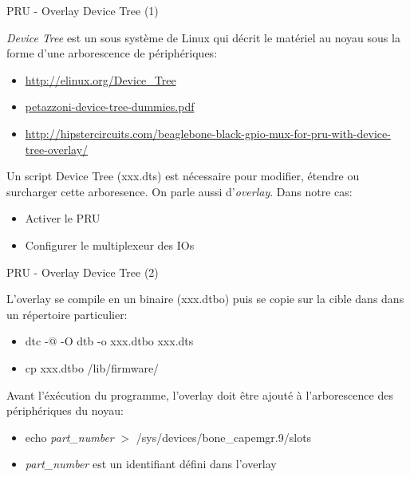 \documentclass{beamer}
\begin{document}
\begin{frame}{PRU - Overlay Device Tree (1)}

  \textit{Device Tree} est un sous syst\`eme de Linux qui
  d\'ecrit le mat\'eriel au noyau sous la forme d'une
  arborescence de p\'eriph\'eriques:
  \begin{itemize}
  \item \begin{tiny} \url{http://elinux.org/Device_Tree} \end{tiny}
  \item \begin{tiny} \url{petazzoni-device-tree-dummies.pdf} \end{tiny}
  \item \begin{tiny} \url{http://hipstercircuits.com/beaglebone-black-gpio-mux-for-pru-with-device-tree-overlay/} \end{tiny} \newline
  \end{itemize}

  Un script Device Tree (xxx.dts) est n\'ecessaire pour modifier,
  \'etendre ou surcharger cette arboresence. On parle aussi
  d'\textit{overlay}. Dans notre cas:
  \begin{itemize}
  \item Activer le PRU
  \item Configurer le multiplexeur des IOs
  \end{itemize}

\end{frame}


\begin{frame}{PRU - Overlay Device Tree (2)}

  L'overlay se compile en un binaire (xxx.dtbo) puis se copie
  sur la cible dans dans un r\'epertoire particulier:
  \begin{itemize}
  \item dtc -@ -O dtb -o xxx.dtbo xxx.dts
  \item cp xxx.dtbo /lib/firmware/ \newline
  \end{itemize}

  Avant l'\'ex\'ecution du programme, l'overlay doit \^etre
  ajout\'e \`a l'arborescence des p\'eriph\'eriques du noyau:
  \begin{itemize}
  \item echo \textit{part\_number} $>$ /sys/devices/bone\_capemgr.9/slots
  \item \textit{part\_number} est un identifiant d\'efini dans
    l'overlay
  \end{itemize}

\end{frame}
\end{document}
